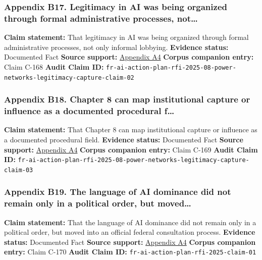 \documentclass[
  american,
  11pt,
  letterpaper,
]{article}
\begin{document}
\subsubsection{Appendix B17. Legitimacy in AI was being organized
through formal administrative processes,
not\ldots{}}\label{ch-07-appendix-b17-legitimacy-in-ai-was-being-organized-through-formal-administrative-processes-not}

\textbf{Claim statement:} That legitimacy in AI was being organized
through formal administrative processes, not only informal lobbying.
\textbf{Evidence status:} Documented Fact \textbf{Source support:}
\hyperref[ch-07-appendix-a4-request-for-information-on-the-development-of-an-artificial-intelligence-ai-action-plan]{Appendix
A4} \textbf{Corpus companion entry:} Claim C-168 \textbf{Audit Claim
ID:}
\texttt{fr-ai-action-plan-rfi-2025-08-power-networks-legitimacy-capture-claim-02}

\subsubsection{Appendix B18. Chapter 8 can map institutional capture or
influence as a documented procedural
f\ldots{}}\label{ch-07-appendix-b18-chapter-8-can-map-institutional-capture-or-influence-as-a-documented-procedural-f}

\textbf{Claim statement:} That Chapter 8 can map institutional capture
or influence as a documented procedural field. \textbf{Evidence status:}
Documented Fact \textbf{Source support:}
\hyperref[ch-07-appendix-a4-request-for-information-on-the-development-of-an-artificial-intelligence-ai-action-plan]{Appendix
A4} \textbf{Corpus companion entry:} Claim C-169 \textbf{Audit Claim
ID:}
\texttt{fr-ai-action-plan-rfi-2025-08-power-networks-legitimacy-capture-claim-03}

\subsubsection{Appendix B19. The language of AI dominance did not remain
only in a political order, but
moved\ldots{}}\label{ch-07-appendix-b19-the-language-of-ai-dominance-did-not-remain-only-in-a-political-order-but-moved}

\textbf{Claim statement:} That the language of AI dominance did not
remain only in a political order, but moved into an official federal
consultation process. \textbf{Evidence status:} Documented Fact
\textbf{Source support:}
\hyperref[ch-07-appendix-a4-request-for-information-on-the-development-of-an-artificial-intelligence-ai-action-plan]{Appendix
A4} \textbf{Corpus companion entry:} Claim C-170 \textbf{Audit Claim
ID:} \texttt{fr-ai-action-plan-rfi-2025-claim-01}
\end{document}
